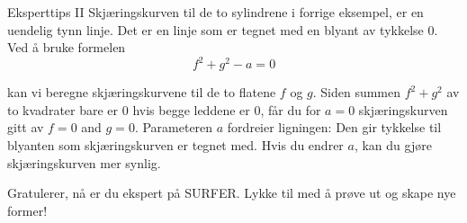 \begin{surferPage}{Eksperttips II}
Skjæringskurven til de to sylindrene i forrige eksempel, er en uendelig tynn linje. Det er en linje som er tegnet med en blyant av tykkelse 0. Ved å bruke formelen 
\[ f^2+g^2-a=0\]

kan vi beregne skjæringskurvene til de to flatene $f$ og $g$. Siden summen $f^2+g^2$ av to kvadrater bare er 
$0$ hvis begge leddene er $0$, får du for $a=0$ skjæringskurven gitt av $f=0$ and $g=0$. 
Parameteren $a$ fordreier ligningen: Den gir tykkelse til blyanten som skjæringskurven er 
tegnet med. Hvis du endrer $a$, kan du gjøre skjæringskurven mer synlig.  \newline \newline

Gratulerer, nå er du ekspert på SURFER. Lykke til med å prøve ut og skape nye former!
\end{surferPage}
